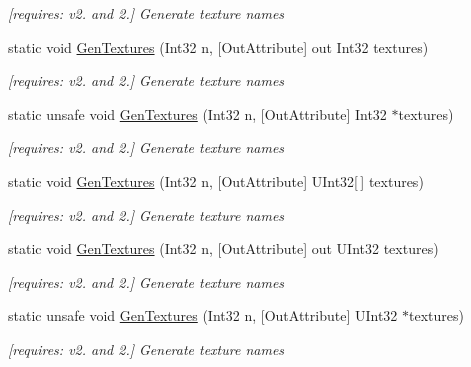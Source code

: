 \begin{DoxyCompactItemize}
\begin{DoxyCompactList}\small\item\em \mbox{[}requires\-: v2. and 2.\mbox{]} Generate texture names \end{DoxyCompactList}\item 
static void \hyperlink{class_open_t_k_1_1_graphics_1_1_e_s20_1_1_g_l_a8624da388afa58fe00619ba6d42a72f8}{Gen\-Textures} (Int32 n, \mbox{[}Out\-Attribute\mbox{]} out Int32 textures)
\begin{DoxyCompactList}\small\item\em \mbox{[}requires\-: v2. and 2.\mbox{]} Generate texture names \end{DoxyCompactList}\item 
static unsafe void \hyperlink{class_open_t_k_1_1_graphics_1_1_e_s20_1_1_g_l_af8a79df1cbfd323e4a6946f4c7f6cfcb}{Gen\-Textures} (Int32 n, \mbox{[}Out\-Attribute\mbox{]} Int32 $\ast$textures)
\begin{DoxyCompactList}\small\item\em \mbox{[}requires\-: v2. and 2.\mbox{]} Generate texture names \end{DoxyCompactList}\item 
static void \hyperlink{class_open_t_k_1_1_graphics_1_1_e_s20_1_1_g_l_aa2021efb54682c2388b56874e86574c2}{Gen\-Textures} (Int32 n, \mbox{[}Out\-Attribute\mbox{]} U\-Int32\mbox{[}$\,$\mbox{]} textures)
\begin{DoxyCompactList}\small\item\em \mbox{[}requires\-: v2. and 2.\mbox{]} Generate texture names \end{DoxyCompactList}\item 
static void \hyperlink{class_open_t_k_1_1_graphics_1_1_e_s20_1_1_g_l_ace945660c4b40dd3d74e35b39e480b1c}{Gen\-Textures} (Int32 n, \mbox{[}Out\-Attribute\mbox{]} out U\-Int32 textures)
\begin{DoxyCompactList}\small\item\em \mbox{[}requires\-: v2. and 2.\mbox{]} Generate texture names \end{DoxyCompactList}\item 
static unsafe void \hyperlink{class_open_t_k_1_1_graphics_1_1_e_s20_1_1_g_l_a1f46ac11ddb09602a59d6be55743e18f}{Gen\-Textures} (Int32 n, \mbox{[}Out\-Attribute\mbox{]} U\-Int32 $\ast$textures)
\begin{DoxyCompactList}\small\item\em \mbox{[}requires\-: v2. and 2.\mbox{]} Generate texture names \end{DoxyCompactList}\item 

\end{DoxyCompactItemize}
